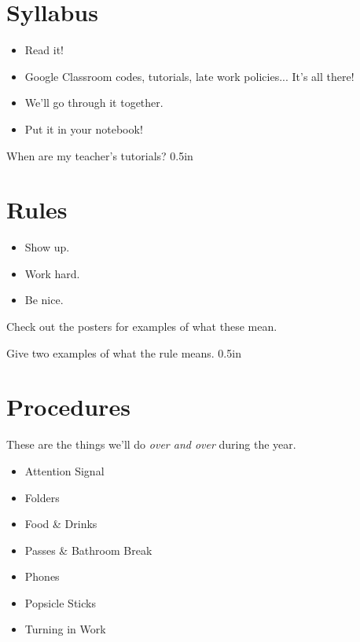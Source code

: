 \section{Syllabus}
\vspace{-0.5\onelineskip}
\begin{itemize}[nosep]
    \item{Read it!}
    \item Google Classroom codes, tutorials, late work policies... It's all there!
    \item We'll go through it together.
    \item{Put it in your notebook!}
\end{itemize}

{
    When are my teacher's tutorials?
}
{0.5in}



\section{Rules}
\vspace{-0.5\onelineskip}
\begin{itemize}[nosep]
    \item{Show up.}
    \item Work hard.
    \item Be nice.
\end{itemize}

Check out the posters for examples of what these mean.

{
    Give two examples of what the rule  means.
}
{0.5in}



\section{Procedures}
These are the things we'll do {\itshape over and over} during the year.
\vspace{-0.5\onelineskip}
\begin{itemize}[nosep]
    \item{Attention Signal}
    \item Folders
    \item Food \& Drinks
    \item Passes \& Bathroom Break 
    \item Phones 
    \item Popsicle Sticks
    \item Turning in Work
\end{itemize}

